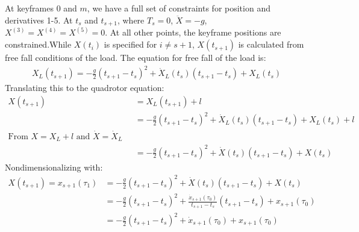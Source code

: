 \documentclass[11pt]{article}
\begin{document}
\mbox{} \newline
At keyframes $0$ and $m$, we have a full set of constraints for position and derivatives 1-5. At $t_s$ and $t_{s+1}$, where $T_{s} = 0$, $\ddot{X} = -g$, $X^{(3)} = X^{(4)} = X^{(5)} = 0$. At all other points, the keyframe positions are constrained.While $X(t_i)$ is specified for $i \ne s+1$, $X(t_{s+1})$ is calculated from free fall conditions of the load. The equation for free fall of the load is:
\begin{align*}
X_L(t_{s+1}) = -\frac{g}{2}(t_{s+1}-t_s)^2+\dot{X}_L(t_s)(t_{s+1}-t_s) + X_L(t_s) 
\end{align*}
Translating this to the quadrotor equation: 
\begin{align*}
X(t_{s+1}) &= X_L(t_{s+1}) + l \\
&= -\frac{g}{2}(t_{s+1}-t_s)^2+\dot{X}_L(t_s)(t_{s+1}-t_s) + X_L(t_s) + l \\
\text{From $X = X_L + l$ and $\dot{X} = \dot{X}_L$ }& \\
&= -\frac{g}{2}(t_{s+1}-t_s)^2+\dot{X}(t_s)(t_{s+1}-t_s) + X(t_s)
\end{align*}
Nondimensionalizing with:
\begin{align*}
X(t_{s+1}) = x_{s+1}(\tau_1)&= -\frac{g}{2} (t_{s+1}-t_s)^2+\dot{X}(t_s)(t_{s+1}-t_s) + X(t_s) \\
&= -\frac{g}{2} (t_{s+1}-t_s)^2+\frac{ \dot{x}_{s+1}(\tau_0) } { t_{s+1}-t_s } (t_{s+1}-t_s) + x_{s+1}(\tau_0) \\
&=  -\frac{g}{2} (t_{s+1}-t_s)^2+ \dot{x}_{s+1}(\tau_0) + x_{s+1}(\tau_0) \\
\end{align*}
\end{document}
